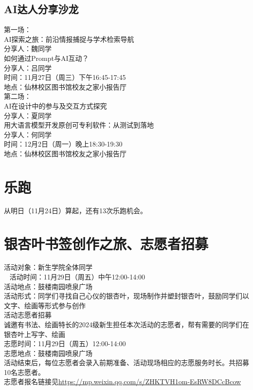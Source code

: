 \documentclass[letterpaper, 12pt]{article}
\begin{document}
\begin{multicols}{2}
\subsection{AI达人分享沙龙}
第一场：\\
AI探索之旅：前沿情报捕捉与学术检索导航\\
分享人：魏同学\\
如何通过Prompt与AI互动？\\
分享人：吕同学\\
时间：11月27日（周三）下午16:45-17:45\\
地点：仙林校区图书馆校友之家小报告厅\\
第二场：\\
AI在设计中的参与及交互方式探究\\
分享人：夏同学\\
用大语言模型开发原创可专利软件：从测试到落地\\
分享人：何同学\\
时间：12月2日（周一）晚上18:30-19:30\\
地点：仙林校区图书馆校友之家小报告厅\\

\section{乐跑}
从明日（11月24日）算起，还有13次乐跑机会。

\section{银杏叶书签创作之旅、志愿者招募}
活动对象：新生学院全体同学\\ 
活动时间：11月29日（周五）中午12:00-14:00\\
活动地点：鼓楼南园喷泉广场\\
活动形式：同学们寻找自己心仪的银杏叶，现场制作并塑封银杏叶，鼓励同学们以文字、绘画等形式参与创作\\
活动志愿者招募\\
诚邀有书法、绘画特长的2024级新生担任本次活动的志愿者，帮有需要的同学们在银杏叶上写字、绘画\\
志愿时间：11月29日（周五）12:00-14:00\\
志愿地点：鼓楼南园喷泉广场\\
活动结束后，每位志愿者会录入前期准备、活动现场相应的志愿服务时长。共招募10名志愿者。\\
志愿者报名链接见\url{https://mp.weixin.qq.com/s/ZHKTVH1om-EsRW8DCcBcow}

\end{multicols}
\end{document}
